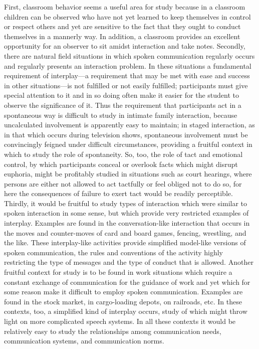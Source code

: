 \documentclass[openany,nobib]{tufte-book}
\begin{document}
First, classroom behavior seems a useful area for study because in a
classroom children can be observed who have not yet learned to keep
themselves in control or respect others and yet are sensitive to the
fact that they ought to conduct themselves in a mannerly way. In
addition, a classroom provides an excellent opportunity for an observer
to sit amidst interaction and take notes. Secondly, there are natural
field situations in which spoken communication regularly occurs and
regularly presents an interaction problem. In these situations a
fundamental requirement of interplay---a requirement that may be met
with ease and success in other situations---is not fulfilled or not
easily fulfilled; participants must give special attention to it and in
so doing often make it easier for the student to observe the
significance of it. Thus the requirement that participants act in a
spontaneous way is difficult to study in intimate family interaction,
because uncalculated involvement is apparently easy to maintain; in
staged interaction, as in that which occurs during television shows,
spontaneous involvement must be convincingly feigned under difficult
circumstances, providing a fruitful context in which to study the role
of spontaneity. So, too, the role of tact and emotional control, by
which participants conceal or overlook facts which might disrupt
euphoria, might be profitably studied in situations such as court
hearings, where persons are either not allowed to act tactfully or feel
obliged not to do so, for here the consequences of failure to exert tact
would be readily perceptible. Thirdly, it would be fruitful to study
types of interaction which were similar to spoken interaction in some
sense, but which provide very restricted examples of interplay. Examples
are found in the conversation-like interaction that occurs in the moves
and counter-moves of card and board games, fencing, wrestling, and the
like. These interplay-like activities provide simplified model-like
versions of spoken communication, the rules and conventions of the
activity highly restricting the type of messages and the type of conduct
that is allowed. Another fruitful context for study is to be found in
work situations which require a constant exchange of communication for
the guidance of work and yet which for some reason make it difficult to
employ spoken communication. Examples are found in the stock market, in
cargo-loading depots, on railroads, etc. In these contexts, too, a
simplified kind of interplay occurs, study of which might throw light on
more complicated speech systems. In all these contexts it would be
relatively easy to study the relationships among communication needs,
communication systems, and communication norms.
\end{document}
